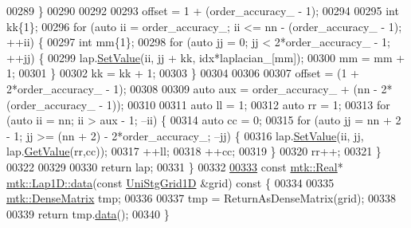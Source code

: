 \begin{DoxyCode}
00289   \}
00290 
00292 
00293   offset = 1 + (order\_accuracy\_ - 1);
00294 
00295   \textcolor{keywordtype}{int} kk\{1\};
00296   \textcolor{keywordflow}{for} (\textcolor{keyword}{auto} ii = order\_accuracy\_; ii <= nn - (order\_accuracy\_ - 1); ++ii) \{
00297     \textcolor{keywordtype}{int} mm\{1\};
00298     \textcolor{keywordflow}{for} (\textcolor{keyword}{auto} jj = 0; jj < 2*order\_accuracy\_ - 1; ++jj) \{
00299       lap.\hyperlink{classmtk_1_1DenseMatrix_ae0f873a6d3a734da467cafb817da64ae}{SetValue}(ii, jj + kk, idx*laplacian\_[mm]);
00300       mm = mm + 1;
00301     \}
00302     kk = kk + 1;
00303   \}
00304 
00306 
00307   offset = (1 + 2*order\_accuracy\_ - 1);
00308 
00309   \textcolor{keyword}{auto} aux = order\_accuracy\_ + (nn - 2*(order\_accuracy\_ - 1));
00310 
00311   \textcolor{keyword}{auto} ll = 1;
00312   \textcolor{keyword}{auto} rr = 1;
00313   \textcolor{keywordflow}{for} (\textcolor{keyword}{auto} ii = nn; ii > aux - 1; --ii) \{
00314     \textcolor{keyword}{auto} cc = 0;
00315     \textcolor{keywordflow}{for} (\textcolor{keyword}{auto} jj = nn + 2 - 1; jj >= (nn + 2) - 2*order\_accuracy\_; --jj) \{
00316       lap.\hyperlink{classmtk_1_1DenseMatrix_ae0f873a6d3a734da467cafb817da64ae}{SetValue}(ii, jj, lap.\hyperlink{classmtk_1_1DenseMatrix_a87fb785713c04b13767947cc3325ce7c}{GetValue}(rr,cc));
00317       ++ll;
00318       ++cc;
00319     \}
00320     rr++;
00321   \}
00322 
00329 
00330   \textcolor{keywordflow}{return} lap;
00331 \}
00332 
\hypertarget{mtk__lap__1d_8cc_source_l00333}{}\hyperlink{classmtk_1_1Lap1D_ab2652725a8407c79247680c7bbd073b8}{00333} \textcolor{keyword}{const} \hyperlink{group__c01-roots_gac080bbbf5cbb5502c9f00405f894857d}{mtk::Real}* \hyperlink{classmtk_1_1Lap1D_ab2652725a8407c79247680c7bbd073b8}{mtk::Lap1D::data}(\textcolor{keyword}{const} \hyperlink{classmtk_1_1UniStgGrid1D}{UniStgGrid1D} &grid)\textcolor{keyword}{ const }\{
00334 
00335   \hyperlink{classmtk_1_1DenseMatrix}{mtk::DenseMatrix} tmp;
00336 
00337   tmp = ReturnAsDenseMatrix(grid);
00338 
00339   \textcolor{keywordflow}{return} tmp.\hyperlink{classmtk_1_1DenseMatrix_a16b3ff56feb2658b9fc7147d1de4d8e7}{data}();
00340 \}
\end{DoxyCode}
